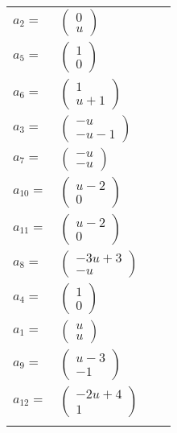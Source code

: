 \documentclass[1p]{elsarticle_modified}
\theoremstyle{definition}
\begin{document}
\begin{tabular}{m{7pt} m{180pt} m{7pt} m{180pt} }
\flushright $a_{2}=$&$\begin{pmatrix}0\\u\end{pmatrix}$ \\
\flushright $a_{5}=$&$\begin{pmatrix}1\\0\end{pmatrix}$ \\
\flushright $a_{6}=$&$\begin{pmatrix}1\\u+1\end{pmatrix}$ \\
\flushright $a_{3}=$&$\begin{pmatrix}- u\\- u-1\end{pmatrix}$ \\
\flushright $a_{7}=$&$\begin{pmatrix}- u\\- u\end{pmatrix}$ \\
\flushright $a_{10}=$&$\begin{pmatrix}u-2\\0\end{pmatrix}$ \\
\flushright $a_{11}=$&$\begin{pmatrix}u-2\\0\end{pmatrix}$ \\
\flushright $a_{8}=$&$\begin{pmatrix}-3 u+3\\- u\end{pmatrix}$ \\
\flushright $a_{4}=$&$\begin{pmatrix}1\\0\end{pmatrix}$ \\
\flushright $a_{1}=$&$\begin{pmatrix}u\\u\end{pmatrix}$ \\
\flushright $a_{9}=$&$\begin{pmatrix}u-3\\-1\end{pmatrix}$ \\
\flushright $a_{12}=$&$\begin{pmatrix}-2 u+4\\1\end{pmatrix}$\\&\end{tabular}
\end{document}
